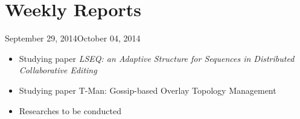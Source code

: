 \documentclass[11pt, english, screen]{report-rd-info}
\begin{document}
\chapter{Weekly Reports}
\label{ann:WeeklyReports}

\begin{fichesuivi}{September 29, 2014}{October 04, 2014}

   \begin{travaileffectue}
      \begin{itemize}
          \item Studying paper \emph{LSEQ: an Adaptive Structure for Sequences in Distributed Collaborative Editing}
         \item Studying paper T-Man: Gossip-based Overlay Topology Management
      \end{itemize}
   \end{travaileffectue}



   \begin{planification}
      \begin{itemize}
         \item Researches to be conducted
      \end{itemize}
   \end{planification}
\end{fichesuivi}
\end{document}
